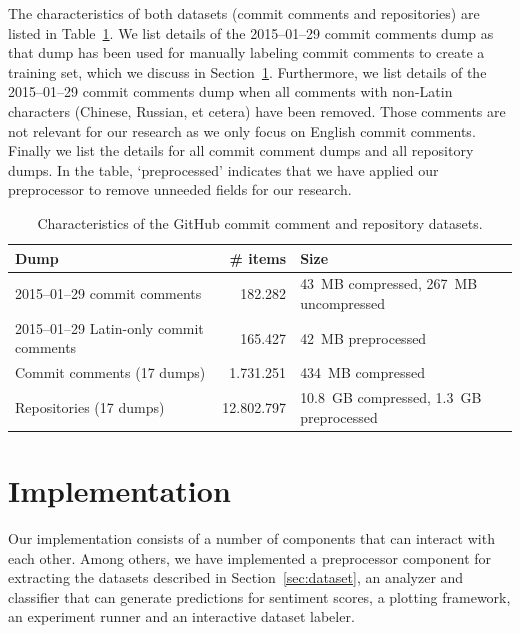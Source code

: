 \documentclass{article}
\begin{document}
The characteristics of both datasets (commit comments and repositories) are
listed in Table~\ref{tab:dataset}. We list details of the 2015--01--29
commit comments dump as that dump has been used for manually labeling commit
comments to create a training set, which we discuss in
Section~\ref{sec:implementation}. Furthermore, we list details of the
2015--01--29 commit comments dump when all comments with non-Latin characters
(Chinese, Russian, et cetera) have been removed. Those comments are not
relevant for our research as we only focus on English commit comments. Finally
we list the details for all commit comment dumps and all repository dumps. In
the table, `preprocessed' indicates that we have applied our preprocessor to
remove unneeded fields for our research.

\begin{table}[h]
  \centering
  \begin{tabular}{l r l}
    \toprule
    \textbf{Dump}                           & \textbf{\# items} & \textbf{Size}                           \\
    \midrule
    2015--01--29 commit comments            & 182.282           & 43~MB compressed, 267~MB uncompressed   \\
    2015--01--29 Latin-only commit comments & 165.427           & 42~MB preprocessed                      \\
    Commit comments (17 dumps)              & 1.731.251         & 434~MB compressed                       \\
    Repositories (17 dumps)                 & 12.802.797        & 10.8~GB compressed, 1.3~GB preprocessed \\
    \bottomrule
  \end{tabular}
  \caption{Characteristics of the GitHub commit comment and repository datasets.}\label{tab:dataset}
\end{table}

\section{Implementation}\label{sec:implementation}
Our implementation consists of a number of components that can interact with 
each other. Among others, we have implemented a preprocessor component for 
extracting the datasets described in Section~\ref{sec:dataset}, an analyzer and 
classifier that can generate predictions for sentiment scores, a plotting 
framework, an experiment runner and an interactive dataset labeler.
\end{document}
